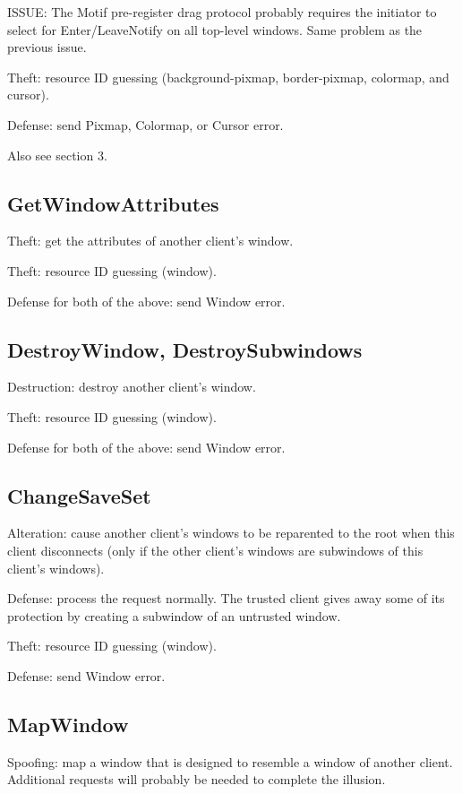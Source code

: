 ISSUE: The Motif pre-register drag protocol probably requires the
initiator to select for Enter/LeaveNotify on all top-level windows.
Same problem as the previous issue.

Theft: resource ID guessing (background-pixmap, border-pixmap,
colormap, and cursor).

Defense: send Pixmap, Colormap, or Cursor error.

Also see section 3.


\subsection{GetWindowAttributes}

Theft: get the attributes of another client's window.

Theft: resource ID guessing (window).

Defense for both of the above: send Window error.


\subsection{DestroyWindow, DestroySubwindows}

Destruction: destroy another client's window.

Theft: resource ID guessing (window).

Defense for both of the above: send Window error.


\subsection{ChangeSaveSet}

Alteration: cause another client's windows to be reparented to the
root when this client disconnects (only if the other client's windows
are subwindows of this client's windows).

Defense: process the request normally.  The trusted client gives away
some of its protection by creating a subwindow of an untrusted window.

Theft: resource ID guessing (window).

Defense: send Window error.


\subsection{MapWindow}

Spoofing: map a window that is designed to resemble a window of
another client.  Additional requests will probably be needed to
complete the illusion.

